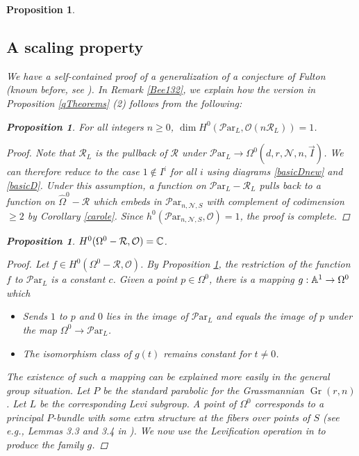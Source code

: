 \documentclass[11pt]{amsart}
\newcommand\mn{\mathcal{N}}
\newcommand\ParL{\mathcal{P}\text{ar}_L}
\newcommand\Par{\mathcal{P}\text{ar} }
\newcommand\Gr{\operatorname{Gr}}
\newtheorem{proposition}[theorem]{Proposition}
\numberwithin{theorem}{subsection}
\begin{document}
{\begin{proposition}
 \subsection{A scaling property}\label{FSP}
We have a self-contained proof of a generalization of a conjecture of Fulton (known before, see \cite[Remark 8.5]{BKq}). In Remark \ref{Bee132}, we explain how the version in Proposition \ref{qTheorems} (2) follows from the following:
\begin{proposition}\label{fulC} For all integers $n\geq 0$,
$\dim H^0(\ParL,\mathcal{O}(n\mathcal{R}_L))=1$.
\end{proposition}
\begin{proof}
 Note that $\mathcal{R}_L$ is the pullback of $\mathcal{R}$ under $\ParL\to {\Omega}^0(d,r,\mn,n,\vec{I})$. We can therefore reduce to the case  $1\not\in I^i$ for all $i$ using diagrams \eqref{basicDnew} and \eqref{basicD}.
Under this assumption, a function on $\ParL-\mathcal{R}_L$ pulls back to a function on $\widehat{\Omega}^0-\mathcal{R}$ which embeds in $\Par_{n,\mn,S}$ with complement of codimension $\geq 2$ by Corollary \ref{carole}. Since $h^0(\Par_{n,\mn,S},\mathcal{O})=1$, the proof is complete.
\end{proof}
\begin{proposition}\label{rigid}
$H^0(\Omega^0-\mathcal{R},\mathcal{O})=\Bbb{C}$.
\end{proposition}
\begin{proof}
Let $f\in H^0(\Omega^0-\mathcal{R},\mathcal{O})$. By Proposition \ref{fulC}, the restriction of the function $f$ to $\ParL$ is a constant $c$. Given a point $p\in \Omega^0$, there is a mapping $g:\Bbb{A}^1\to \Omega^0$ which
\begin{itemize}
\item[-] Sends $1$ to $p$ and $0$ lies in the image of $\ParL$ and equals the image of $p$ under the map $\Omega^0\to \ParL$.
\item[-] The isomorphism class of $g(t)$ remains constant for $t\neq 0$.
\end{itemize}
The existence of such a mapping can be explained more easily in the general group situation. Let $P$ be the standard parabolic for the Grassmannian $\Gr(r,n)$. Let $L$ be the corresponding Levi subgroup. A point of $\Omega^0$ corresponds to a principal $P$-bundle with some extra structure at the fibers over points of $S$ (see e.g., Lemmas 3.3 and 3.4 in \cite{BKiers}). We now use the Levification operation in  \cite[Section 3.8]{BKq} to produce the family $g$.
\end{proof}

\end{proposition}}
\end{document}
